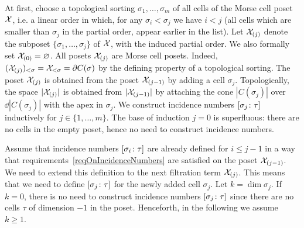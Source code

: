 \begin{con}\label{conMorseIncidenceNumbers}
At first, choose a topological sorting $\sigma_1,\ldots,\sigma_m$ of all cells of the Morse cell poset $\mathcal{X}$, i.e. a linear order in which, for any $\sigma_i<\sigma_j$ we have $i<j$ (all cells which are smaller than $\sigma_j$ in the partial order, appear earlier in the list). Let $\mathcal{X}_{(j)}$ denote the subposet $\{\sigma_1,\ldots,\sigma_j\}$ of $\mathcal{X}$, with the induced partial order. We also formally set $\mathcal{X}_{(0)}=\varnothing$. All posets $\mathcal{X}_{(j)}$ are Morse cell posets. Indeed, $(\mathcal{X}_{(j)})_{<\sigma}=\mathcal{X}_{<\sigma}=\partial C(\sigma)$ by the defining property of a topological sorting. The poset $\mathcal{X}_{(j)}$ is obtained from the poset $\mathcal{X}_{(j-1)}$ by adding a cell $\sigma_j$. Topologically, the space $|\mathcal{X}_{(j)}|$ is obtained from $|\mathcal{X}_{(j-1)}|$ by attaching the cone $|C(\sigma_j)|$ over $\dd|C(\sigma_j)|$ with the apex in $\sigma_j$. We construct incidence numbers $[\sigma_j\colon \tau]$ inductively for $j\in\{1,\ldots,m\}$. The base of induction $j=0$ is superfluous: there are no cells in the empty poset, hence no need to construct incidence numbers.

Assume that incidence numbers $[\sigma_i\colon \tau]$ are already defined for $i\leq j-1$ in a way that requirements~\ref{reqOnIncidenceNumbers} are satisfied on the poset $\mathcal{X}_{(j-1)}$. We need to extend this definition to the next filtration term $\mathcal{X}_{(j)}$. This means that we need to define $[\sigma_j\colon \tau]$ for the newly added cell $\sigma_j$. Let $k=\dim\sigma_j$. If $k=0$, there is no need to construct incidence numbers $[\sigma_j\colon \tau]$ since there are no cells $\tau$ of dimension $-1$ in the poset. Henceforth, in the following we assume $k\geq 1$.


\end{con}
